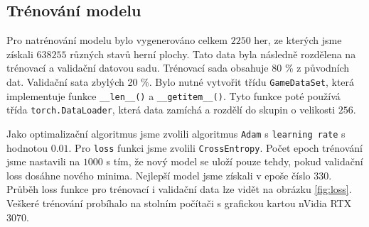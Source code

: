 \documentclass[a4paper,11pt]{article}
\begin{document}
	\subsection{Trénování modelu}
		Pro natrénování modelu bylo vygenerováno celkem $2250$ her, ze kterých jsme získali $638 255$ různých stavů herní plochy. Tato data byla následně rozdělena na trénovací a validační datovou sadu. Trénovací sada obsahuje 80 \% z původních dat. Validační sata zbylých 20 \%. Bylo nutné vytvořit třídu \texttt{GameDataSet}, která implementuje funkce \texttt{\_\_len\_\_()} a \texttt{\_\_getitem\_\_()}. Tyto funkce poté používá třída \texttt{torch.DataLoader}, která data zamíchá a rozdělí do skupin o velikosti $256$.
		
		Jako optimalizační algoritmus jsme zvolili algoritmus \texttt{Adam} s \texttt{learning rate} s hodnotou $0.01$. Pro \texttt{loss} funkci jsme zvolili \texttt{CrossEntropy}. Počet epoch trénování jsme nastavili na $1000$ s tím, že nový model se uloží pouze tehdy, pokud validační loss dosáhne nového minima. Nejlepší model jsme získali v epoše číslo $330$. Průběh loss funkce pro trénovací i validační data lze vidět na obrázku \ref{fig:loss}. Veškeré trénování probíhalo na stolním počítači s grafickou kartou nVidia RTX 3070.
		
\end{document}
